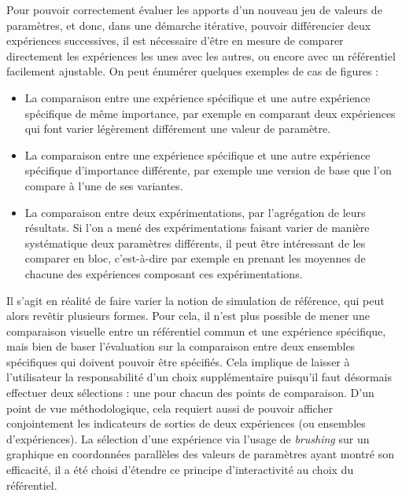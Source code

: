 Pour pouvoir correctement évaluer les apports d'un nouveau jeu de valeurs de paramètres, et donc, dans une démarche itérative, pouvoir différencier deux expériences successives, il est nécessaire d'être en mesure de comparer directement les expériences les unes avec les autres, ou encore avec un référentiel facilement ajustable.
On peut énumérer quelques exemples de cas de figures :
\begin{itemize}
	\item La comparaison entre une expérience spécifique et une autre expérience spécifique de même \og importance\fg{}, par exemple en comparant deux expériences qui font varier légèrement différement une valeur de paramètre.
	\item La comparaison entre une expérience spécifique et une autre expérience spécifique d'\og importance\fg{} différente, par exemple une version \og de base\fg{} que l'on compare à l'une de ses variantes.
	\item La comparaison entre deux expérimentations, par l'agrégation de leurs résultats.
	Si l'on a mené des expérimentations faisant varier de manière systématique deux paramètres différents, il peut être intéressant de les comparer en bloc, c'est-à-dire par exemple en prenant les moyennes de chacune des expériences composant ces expérimentations.
\end{itemize}

Il s'agit en réalité de faire varier la notion de \og simulation de référence\fg{}, qui peut alors revêtir plusieurs formes.
Pour cela, il n'est plus possible de mener une comparaison visuelle entre un référentiel commun et une expérience spécifique, mais bien de baser l'évaluation sur la comparaison entre deux ensembles spécifiques qui doivent pouvoir être spécifiés.
Cela implique de laisser à l'utilisateur la responsabilité d'un choix supplémentaire puisqu'il faut désormais effectuer deux sélections : une pour chacun des points de comparaison.
D'un point de vue méthodologique, cela requiert aussi de pouvoir afficher conjointement les indicateurs de sorties de deux expériences (ou ensembles d'expériences).
La sélection d'une expérience via l'usage de \textit{brushing} sur un graphique en coordonnées parallèles des valeurs de paramètres ayant montré son efficacité, il a été choisi d'étendre ce principe d'interactivité au choix du référentiel.

